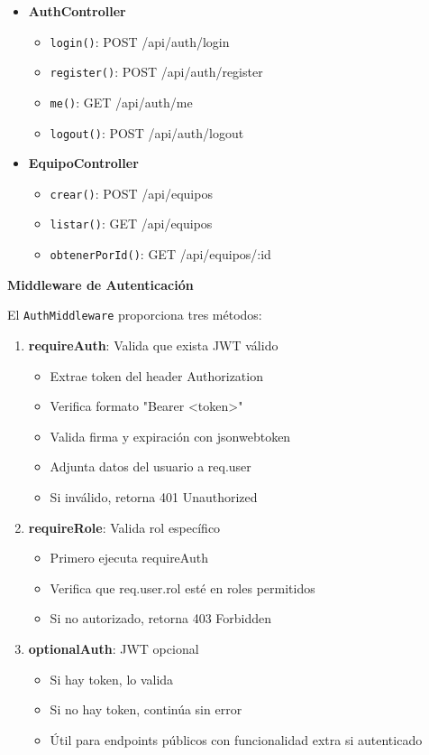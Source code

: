 \documentclass[12pt,a4paper]{article}
\begin{document}
\begin{itemize}
    \item \textbf{AuthController}
    \begin{itemize}
        \item \texttt{login()}: POST /api/auth/login
        \item \texttt{register()}: POST /api/auth/register
        \item \texttt{me()}: GET /api/auth/me
        \item \texttt{logout()}: POST /api/auth/logout
    \end{itemize}

    \item \textbf{EquipoController}
    \begin{itemize}
        \item \texttt{crear()}: POST /api/equipos
        \item \texttt{listar()}: GET /api/equipos
        \item \texttt{obtenerPorId()}: GET /api/equipos/:id
    \end{itemize}
\end{itemize}

\textbf{Middleware de Autenticación}

El \texttt{AuthMiddleware} proporciona tres métodos:

\begin{enumerate}
    \item \textbf{requireAuth}: Valida que exista JWT válido
    \begin{itemize}
        \item Extrae token del header Authorization
        \item Verifica formato "Bearer <token>"
        \item Valida firma y expiración con jsonwebtoken
        \item Adjunta datos del usuario a req.user
        \item Si inválido, retorna 401 Unauthorized
    \end{itemize}

    \item \textbf{requireRole}: Valida rol específico
    \begin{itemize}
        \item Primero ejecuta requireAuth
        \item Verifica que req.user.rol esté en roles permitidos
        \item Si no autorizado, retorna 403 Forbidden
    \end{itemize}

    \item \textbf{optionalAuth}: JWT opcional
    \begin{itemize}
        \item Si hay token, lo valida
        \item Si no hay token, continúa sin error
        \item Útil para endpoints públicos con funcionalidad extra si autenticado
    \end{itemize}
\end{enumerate}
\end{document}
